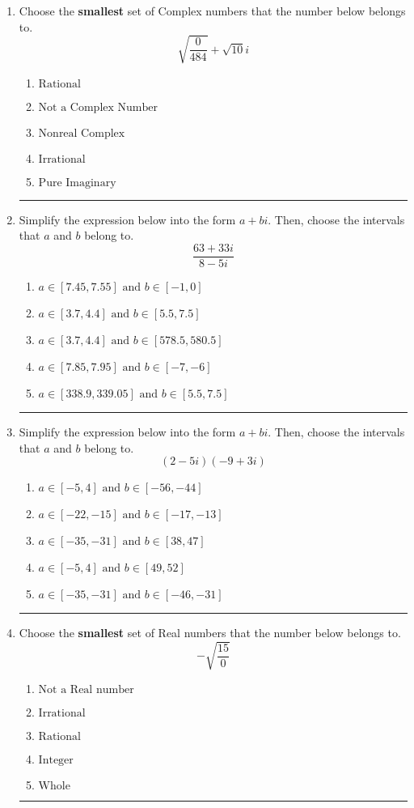 \documentclass[14pt]{extbook}
\newcommand{\litem}[1]{\item#1\hspace*{-1cm}\rule{\textwidth}{0.4pt}}
\begin{document}
\begin{enumerate}
{\begin{enumerate}[label=\Alph*.]
\end{enumerate} }
\litem{
Choose the \textbf{smallest} set of Complex numbers that the number below belongs to.\[ \sqrt{\frac{0}{484}}+\sqrt{10}i \]\begin{enumerate}[label=\Alph*.]
\item \( \text{Rational} \)
\item \( \text{Not a Complex Number} \)
\item \( \text{Nonreal Complex} \)
\item \( \text{Irrational} \)
\item \( \text{Pure Imaginary} \)

\end{enumerate} }
\litem{
Simplify the expression below into the form $a+bi$. Then, choose the intervals that $a$ and $b$ belong to.\[ \frac{63 + 33 i}{8 - 5 i} \]\begin{enumerate}[label=\Alph*.]
\item \( a \in [7.45, 7.55] \text{ and } b \in [-1, 0] \)
\item \( a \in [3.7, 4.4] \text{ and } b \in [5.5, 7.5] \)
\item \( a \in [3.7, 4.4] \text{ and } b \in [578.5, 580.5] \)
\item \( a \in [7.85, 7.95] \text{ and } b \in [-7, -6] \)
\item \( a \in [338.9, 339.05] \text{ and } b \in [5.5, 7.5] \)

\end{enumerate} }
\litem{
Simplify the expression below into the form $a+bi$. Then, choose the intervals that $a$ and $b$ belong to.\[ (2 - 5 i)(-9 + 3 i) \]\begin{enumerate}[label=\Alph*.]
\item \( a \in [-5, 4] \text{ and } b \in [-56, -44] \)
\item \( a \in [-22, -15] \text{ and } b \in [-17, -13] \)
\item \( a \in [-35, -31] \text{ and } b \in [38, 47] \)
\item \( a \in [-5, 4] \text{ and } b \in [49, 52] \)
\item \( a \in [-35, -31] \text{ and } b \in [-46, -31] \)

\end{enumerate} }
\litem{
Choose the \textbf{smallest} set of Real numbers that the number below belongs to.\[ -\sqrt{\frac{15}{0}} \]\begin{enumerate}[label=\Alph*.]
\item \( \text{Not a Real number} \)
\item \( \text{Irrational} \)
\item \( \text{Rational} \)
\item \( \text{Integer} \)
\item \( \text{Whole} \)


\end{enumerate}}
\end{enumerate}
\end{document}
